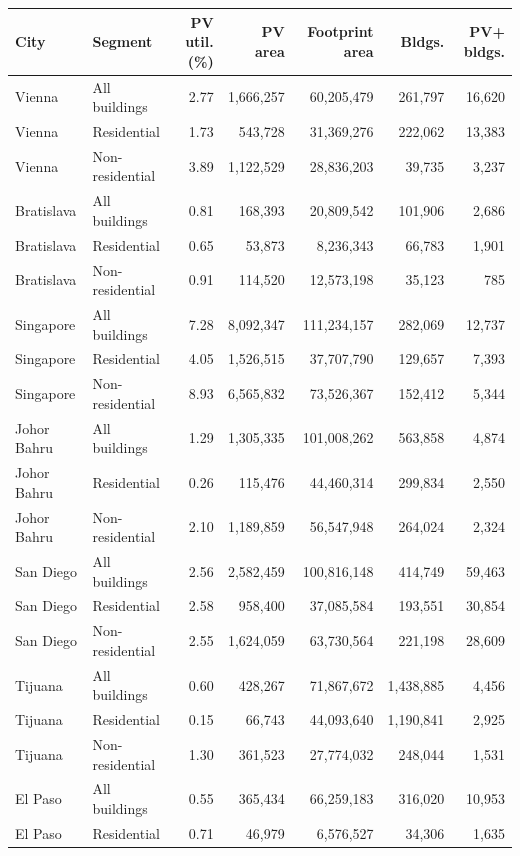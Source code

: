 {\scriptsize
\setlength{\tabcolsep}{2pt}
\renewcommand{\arraystretch}{0.9}
\begin{tabular}{@{}llrrrrr@{}}
\toprule
City & Segment & PV util. (\%) & PV area & Footprint area & Bldgs. & PV+ bldgs. \\
\midrule
Vienna & All buildings & 2.77 & 1,666,257 & 60,205,479 & 261,797 & 16,620 \\
Vienna & Residential & 1.73 & 543,728 & 31,369,276 & 222,062 & 13,383 \\
Vienna & Non-residential & 3.89 & 1,122,529 & 28,836,203 & 39,735 & 3,237 \\
Bratislava & All buildings & 0.81 & 168,393 & 20,809,542 & 101,906 & 2,686 \\
Bratislava & Residential & 0.65 & 53,873 & 8,236,343 & 66,783 & 1,901 \\
Bratislava & Non-residential & 0.91 & 114,520 & 12,573,198 & 35,123 & 785 \\
Singapore & All buildings & 7.28 & 8,092,347 & 111,234,157 & 282,069 & 12,737 \\
Singapore & Residential & 4.05 & 1,526,515 & 37,707,790 & 129,657 & 7,393 \\
Singapore & Non-residential & 8.93 & 6,565,832 & 73,526,367 & 152,412 & 5,344 \\
Johor Bahru & All buildings & 1.29 & 1,305,335 & 101,008,262 & 563,858 & 4,874 \\
Johor Bahru & Residential & 0.26 & 115,476 & 44,460,314 & 299,834 & 2,550 \\
Johor Bahru & Non-residential & 2.10 & 1,189,859 & 56,547,948 & 264,024 & 2,324 \\
San Diego & All buildings & 2.56 & 2,582,459 & 100,816,148 & 414,749 & 59,463 \\
San Diego & Residential & 2.58 & 958,400 & 37,085,584 & 193,551 & 30,854 \\
San Diego & Non-residential & 2.55 & 1,624,059 & 63,730,564 & 221,198 & 28,609 \\
Tijuana & All buildings & 0.60 & 428,267 & 71,867,672 & 1,438,885 & 4,456 \\
Tijuana & Residential & 0.15 & 66,743 & 44,093,640 & 1,190,841 & 2,925 \\
Tijuana & Non-residential & 1.30 & 361,523 & 27,774,032 & 248,044 & 1,531 \\
El Paso & All buildings & 0.55 & 365,434 & 66,259,183 & 316,020 & 10,953 \\
El Paso & Residential & 0.71 & 46,979 & 6,576,527 & 34,306 & 1,635 \\

\end{tabular}}
